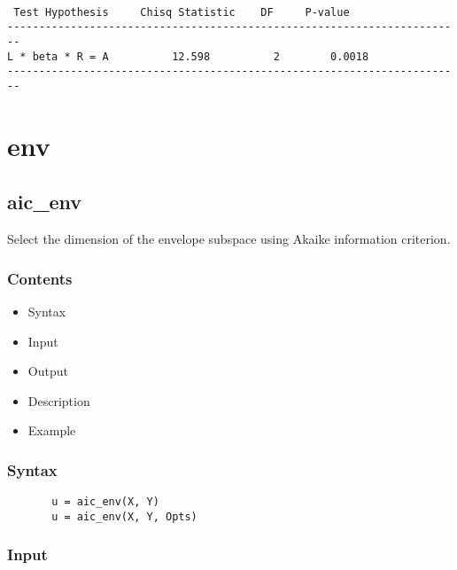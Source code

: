 \documentclass[a4paper,11pt,openany]{memoir}
\begin{document}
        \color{lightgray}\ttfamily \begin{verbatim}

 Test Hypothesis     Chisq Statistic    DF     P-value
------------------------------------------------------------------------
L * beta * R = A          12.598          2        0.0018
------------------------------------------------------------------------
\end{verbatim} \rmfamily
\color{black}
    


\newpage



\chapter{env}
    
\rmfamily
\color{black}\section{aic\_env}

\begin{par}
Select the dimension of the envelope subspace using Akaike information criterion.
\end{par} \vspace{1em}

\subsection*{Contents}

\begin{itemize}
\setlength{\itemsep}{-1ex}
   \item Syntax
   \item Input
   \item Output
   \item Description
   \item Example
\end{itemize}


\subsection*{Syntax}


\begin{verbatim}       u = aic_env(X, Y)
       u = aic_env(X, Y, Opts)\end{verbatim}
    

\subsection*{Input}
\end{document}
